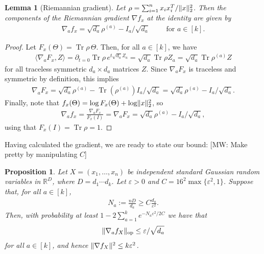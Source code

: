 \documentclass{article}
\newtheorem{prop}[theorem]{Proposition}
\newtheorem{lemma}[theorem]{Lemma}
\DeclarePairedDelimiter{\norm}{\lVert}{\rVert}
\newcommand{\R}{{\mathbb{R}}}
\newcommand{\op}{\operatorname{op}}
\newcommand\eps{\varepsilon}
\newcommand\samp{x}
\newcommand\rv{X}
\newcommand\tr{\operatorname{Tr}}
\newcommand{\MW}[1]{{\color{red}[MW: #1]}}
\begin{document}
\begin{lemma}[Riemannian gradient]\label{lem:gradient}
Let $\rho = \sum_{i=1}^n \samp_i \samp_i^T / \norm{\samp}_2^2$.
Then the components of the Riemannian gradient $\nabla f_{\samp}$ at the identity are given by
\begin{align*}
  \nabla_a f_{\samp} = \sqrt{d_a} \rho^{(a)} - I_a/\sqrt{d_a} \qquad \text{ for } a \in [k].
\end{align*}
\end{lemma}
\begin{proof}
  Let $F_{\samp}(\Theta) = \tr \rho \, \Theta$.
  Then, for all $a\in[k]$, we have
  \begin{align*}
   \langle \nabla_a F_{\samp} , Z \rangle
  = \partial_{t=0} \tr \rho \, e^{t \sqrt{d_a} Z_a}
  = \sqrt{d_a} \tr \rho Z_a
  = \sqrt{d_a} \tr \rho^{(a)} Z
  \end{align*}
  for all traceless symmetric $d_a \times d_a$ matrices $Z$.
  Since $\nabla_a F_{\samp}$ is traceless and symmetric by definition, this implies
  \begin{align*}
    \nabla_a F_{\samp}
  = \sqrt{d_a} \rho^{(a)} - \tr(\rho^{(a)}) I_a /\sqrt{d_a}
  = \sqrt{d_a} \rho^{(a)} - I_a/\sqrt{d_a}.
  \end{align*}
  Finally, note that $f_{\samp}(\Theta) = \log F_{\samp}(\Theta) + \log \norm{\samp}_2^2$, so
  \begin{align*}
    \nabla_a f_{\samp}
  = \frac{\nabla_a F_{\samp}}{F_{\samp}(I)}
  = \nabla_a F_{\samp}
  = \sqrt{d_a} \rho^{(a)} - I_a/\sqrt{d_a},
  \end{align*}
  using that $F_{\samp}(I) = \tr \rho = 1$.
\end{proof}

Having calculated the gradient, we are ready to state our bound:
\MW{Make pretty by manipulating $C$}
\begin{prop}\label{prop:gradient-bound}
Let $\rv = (\samp_1,\dots,\samp_n)$ be independent standard Gaussian random variables in $\R^D$, where $D=d_1\cdots{}d_k$.
Let $\eps>0$ and $C = 16^2\max\{\eps^2,1\}$.
Suppose that, for all $a \in [k]$,
\begin{align*}
  N_a := \frac{n D}{d_a} \geq C \frac{d_a}{\eps^2}.
\end{align*}
Then, with probability at least $1 - 2 \sum_{a=1}^k e^{-N_a \eps^2/2C}$ we have that
\begin{align*}
  \norm{\nabla_a f_{\rv}}_{\op} \leq \eps/\sqrt{d_a}
\end{align*}
for all $a\in[k]$, and hence $\norm{\nabla f_{\rv}}^2 \leq k \eps^2$.
\end{prop}
\end{document}
